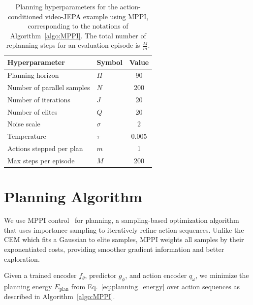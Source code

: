 \documentclass{article}
\begin{document}
\begin{table}[h]
\centering
\caption{Planning hyperparameters for the action-conditioned video-JEPA example using MPPI, corresponding to the notations of Algorithm~\ref{algo:MPPI}. The total number of replanning steps for an evaluation episode is $\frac{M}{m}$.
}
\label{tab:planning_hyperparams}
\begin{tabular}{llc}
\toprule
\textbf{Hyperparameter} & \textbf{Symbol} & \textbf{Value} \\
\midrule
Planning horizon & $H$ & 90 \\
Number of parallel samples & $N$ & 200 \\
Number of iterations & $J$ & 20 \\
Number of elites & $Q$ & 20 \\
Noise scale & $\sigma$ & 2 \\
Temperature & $\tau$ & 0.005 \\
Actions stepped per plan & $m$ & 1 \\
Max steps per episode & $M$ & 200 \\
\bottomrule
\end{tabular}
\end{table}

\section{Planning Algorithm}\label{app:planning_algo}

We use MPPI control~\citep{MPPI} for planning, a sampling-based optimization algorithm that uses importance sampling to iteratively refine action sequences.
Unlike the CEM which fits a Gaussian to elite samples, MPPI weights all samples by their exponentiated costs, providing smoother gradient information and better exploration.

Given a trained encoder $f_\theta$, predictor $g_\phi$, and action encoder $q_\omega$, we minimize the planning energy $E_{\text{plan}}$ from Eq.~\eqref{eq:planning_energy} over action sequences as described in Algorithm~\ref{algo:MPPI}.
\end{document}
